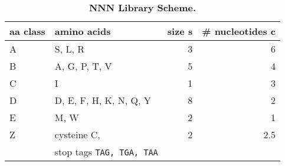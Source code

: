 \begin{table}[!ht]
\captionsetup{labelformat=supp}
\caption{\bf NNN Library Scheme.}
\centering
\begin{tabular}{|l|l|r|r|}\hline
\bf aa class & \bf amino acids & \bf size s & \bf \# nucleotides c \\ \hline
A & S, L, R & 3 & 6 \\ \hline
B & A, G, P, T, V & 5 & 4 \\ \hline
C & I  & 1 & 3 \\ \hline
D & D, E, F, H, K, N, Q, Y & 8 & 2 \\ \hline
E & M, W & 2 & 1\\\hline
Z & cysteine C,  & 2 & 2.5\\ 
& stop tags {\tt TAG, TGA, TAA} && \\\hline
\end{tabular}
\end{table}
